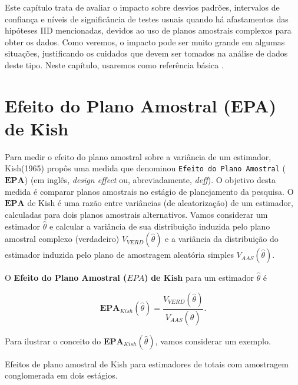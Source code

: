 \documentclass[]{book}
\numberwithin{example}{chapter}
\numberwithin{remark}{chapter}
\numberwithin{definition}{chapter}
\let\BeginKnitrBlock\begin \let\EndKnitrBlock\end
\begin{document}
Este capítulo trata de avaliar o impacto sobre desvios padrões,
intervalos de confiança e níveis de significância de testes usuais
quando há afastamentos das hipóteses IID mencionadas, devidos ao uso de
planos amostrais complexos para obter os dados. Como veremos, o impacto
pode ser muito grande em algumas situações, justificando os cuidados que
devem ser tomados na análise de dados deste tipo. Neste capítulo,
usaremos como referência básica \citep{Sk89a}.

\section{Efeito do Plano Amostral (EPA) de
Kish}\label{efeito-do-plano-amostral-epa-de-kish}

Para medir o efeito do plano amostral sobre a variância de um estimador,
Kish(1965) propôs uma medida que denominou
\texttt{Efeito\ do\ Plano\ Amostral} (\(\mathbf{EPA}\)) (em inglês,
\emph{design effect} ou, abreviadamente, \emph{deff}). O objetivo desta
medida é comparar planos amostrais no estágio de planejamento da
pesquisa. O \(\mathbf{EPA}\) de Kish é uma razão entre variâncias (de
aleatorização) de um estimador, calculadas para dois planos amostrais
alternativos. Vamos considerar um estimador \(\hat{\theta}\) e calcular
a variância de sua distribuição induzida pelo plano amostral complexo
(verdadeiro) \(V_{VERD}\left( \hat{\theta}\right)\) e a variância da
distribuição do estimador induzida pelo plano de amostragem aleatória
simples \(V_{AAS}\left(\hat{\theta}\right)\).

\BeginKnitrBlock{definition}
\protect\hypertarget{def:unnamed-chunk-1}{}{\label{def:unnamed-chunk-1}}O
\textbf{Efeito do Plano Amostral (\(EPA\))} \textbf{de Kish} para um
estimador \(\hat{\theta}\) é
\EndKnitrBlock{definition}

\begin{equation}
\mathbf{EPA}_{Kish}\left( \hat{\theta}\right) =\frac{V_{VERD}\left( \hat{\theta}\right) }{V_{AAS}\left( \hat{\theta}\right) }. \label{eq:epa1} \end{equation}

Para ilustrar o conceito do
\(\mathbf{EPA}_{Kish}\left( \hat{\theta}\right)\), vamos considerar um
exemplo.

\BeginKnitrBlock{example}
\protect\hypertarget{ex:epakish}{}{\label{ex:epakish}}Efeitos de plano
amostral de Kish para estimadores de totais com amostragem conglomerada
em dois estágios.
\EndKnitrBlock{example}
\end{document}
